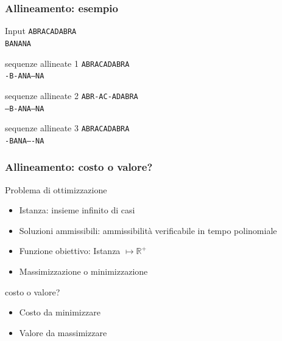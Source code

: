 \begin{frame}[fragile]
\frametitle{Allineamento: esempio}
\begin{block}{Input}
\texttt{ABRACADABRA}\\
\texttt{BANANA}
\end{block}

\begin{block}{sequenze allineate 1}
\texttt{ABRACADABRA}\\
\texttt{-B-ANA---NA}
\end{block}
\begin{block}{sequenze allineate 2}
\texttt{ABR-AC-ADABRA}\\
\texttt{---B-ANA---NA}
\end{block}
\begin{block}{sequenze allineate 3}
\texttt{ABRACADABRA}\\
\texttt{-BANA----NA}
\end{block}
\end{frame}

\begin{frame}[fragile]
\frametitle{Allineamento: costo o valore?}
\begin{block}{Problema di ottimizzazione}
\begin{itemize}
\item
Istanza: insieme infinito di casi
\item
Soluzioni ammissibili: ammissibilità verificabile in tempo polinomiale
\item
Funzione obiettivo: Istanza $\mapsto \mathbb{R}^{+}$
\item
Massimizzazione o minimizzazione
\end{itemize}
\end{block}
\begin{block}{costo o valore?}
\begin{itemize}
\item
Costo da minimizzare
\item
Valore da massimizzare
\end{itemize}
\end{block}
\end{frame}

